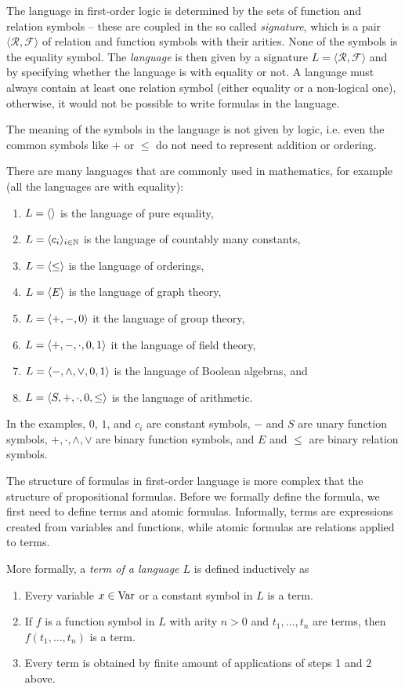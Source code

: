 The language in first-order logic is determined by the sets of function and relation symbols -- these are coupled in the so called \emph{signature}, which is a pair $\langle \mathcal{R}, \mathcal{F} \rangle$ of relation and function symbols with their arities. None of the symbols is the equality symbol. The \emph{language} is then given by a signature $L = \langle \mathcal{R}, \mathcal{F} \rangle$ and by specifying whether the language is with equality or not. A language must always contain at least one relation symbol (either equality or a non-logical one), otherwise, it would not be possible to write formulas in the language.

The meaning of the symbols in the language is not given by logic, i.e. even the common symbols like $+$ or $\leq$ do not need to represent addition or ordering.

There are many languages that are commonly used in mathematics, for example (all the languages are with equality):
\begin{enumerate}
  \item $L = \langle   \rangle$ is the language of pure equality,
  \item $L = \langle c_i \rangle_{i \in \mathbb{N}}$ is the language of countably many constants,
  \item $L = \langle \leq \rangle$ is the language of orderings,
  \item $L = \langle E  \rangle$ is the language of graph theory,
  \item $L = \langle +, -, 0 \rangle$ it the language of group theory,
  \item $L = \langle +, -, \cdot, 0, 1 \rangle$ it the language of field theory,
  \item $L = \langle -, \land, \lor, 0, 1 \rangle$ is the language of Boolean algebras, and
  \item $L = \langle S, +, \cdot, 0, \leq \rangle$ is the language of arithmetic.
\end{enumerate}
In the examples, $0$, $1$, and $c_i$ are constant symbols, $-$ and $S$ are unary function symbols, $+, \cdot, \land, \lor$ are binary function symbols, and $E$ and $\leq$ are binary relation symbols.

The structure of formulas in first-order language is more complex that the structure of propositional formulas. Before we formally define the formula, we first need to define terms and atomic formulas. Informally, terms are expressions created from variables and functions, while atomic formulas are relations applied to terms.

More formally, a \emph{term of a language $L$} is defined inductively as 
\begin{enumerate}
  \item Every variable $x \in \operatorname{Var}$ or a constant symbol in $L$ is a term.
  \item If $f$ is a function symbol in $L$ with arity $n>0$ and $t_1, \dots, t_n$ are terms, then $f(t_1, \dots, t_n)$ is a term.
  \item Every term is obtained by finite amount of applications of steps 1 and 2 above.
\end{enumerate}

